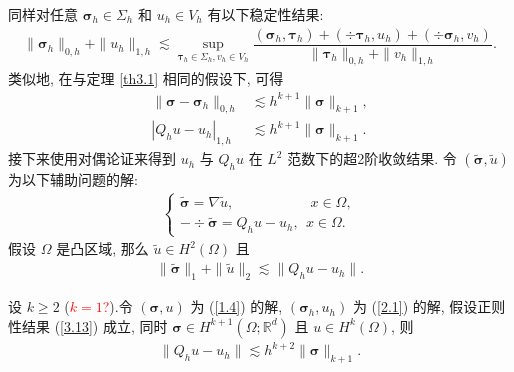 同样对任意 $\boldsymbol\sigma_h\in\Sigma_h$ 和 $u_h\in V_h$ 有以下稳定性结果:
\begin{align}
\label{3.9}
\|\boldsymbol\sigma_h\|_{0,h}+\|u_h\|_{1,h}\lesssim\sup_{\boldsymbol\tau_h\in \Sigma_h, v_h\in V_h}\dfrac{(\boldsymbol\sigma_h, \boldsymbol\tau_h)+(\div\boldsymbol\tau_h, u_h)+(\div\boldsymbol\sigma_h, v_h)}{\|\boldsymbol\tau_h\|_{0,h}+\|v_h\|_{1,h}}.
\end{align}
类似地, 在与定理 \ref{th3.1} 相同的假设下, 可得
\begin{align}
\label{3.10}
\|\boldsymbol\sigma-\boldsymbol\sigma_h\|_{0,h}&\lesssim h^{k+1}\|\boldsymbol\sigma\|_{k+1},\\
\label{3.11}
|Q_h u-u_h|_{1,h}&\lesssim h^{k+1}\|\boldsymbol\sigma\|_{k+1}.
\end{align}
接下来使用对偶论证来得到 $u_h$ 与 $Q_h u$ 在 $L^2$ 范数下的超2阶收敛结果.
令 $(\widetilde{\boldsymbol{\sigma}}, \widetilde{u})$ 为以下辅助问题的解:
\begin{align}
\label{3.12}
\left\{
\begin{array}{ll}
\widetilde{\boldsymbol{\sigma}} = \nabla\widetilde{u}, \qquad\qquad\quad\ \ x\in \Omega,\\
-\div\widetilde{\boldsymbol{\sigma}} = Q_h u-u_h, \ \ x\in \Omega.
\end{array}
\right.
\end{align}
假设 $\Omega$ 是凸区域, 那么 $\widetilde{u}\in H^2(\Omega)$ 且
\begin{align}
\label{3.13}
\|\widetilde{\boldsymbol{\sigma}}\|_1+\|\widetilde{u}\|_2\lesssim\|Q_h u-u_h\|.
\end{align}
\begin{theorem}
设 $k\geq2$ (\textcolor{red}{$k=1$?}).令 $(\boldsymbol\sigma, u)$ 为 (\ref{1.4}) 的解, $(\boldsymbol\sigma_h, u_h)$ 为 (\ref{2.1}) 的解, 假设正则性结果 (\ref{3.13}) 成立, 同时 $\boldsymbol\sigma\in H^{k+1}(\Omega;\mathbb{R}^d)$ 且 $u\in H^{k}(\Omega)$, 则
\begin{align}
\label{3.14}
\|Q_h u-u_h\|\lesssim h^{k+2}\|\boldsymbol\sigma\|_{k+1}.
\end{align}
\end{theorem}
